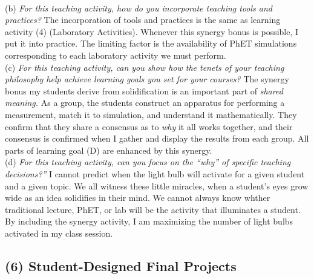 \documentclass[../../../main.tex]{subfiles}
\begin{document}
\\
\vspace{0.25cm}
(b) \textit{For this teaching activity, how do you incorporate teaching tools and practices?}  The incorporation of tools and practices is the same as learning activity (4) (Laboratory Activities).  Whenever this synergy bonus is possible, I put it into practice.  The limiting factor is the availability of PhET simulations corresponding to each laboratory activity we must perform.
\\
\vspace{0.25cm}
(c) \textit{For this teaching activity, can you show how the tenets of your teaching philosophy help achieve learning goals you
set for your courses?}  The synergy bonus my students derive from solidification is an important part of \textit{shared meaning.}  As a group, the students construct an apparatus for performing a measurement, match it to simulation, and understand it mathematically.  They confirm that they share a consensus as to \textit{why} it all works together, and their consensus is confirmed when I gather and display the results from each group.  All parts of learning goal (D) are enhanced by this synergy.
\\
\vspace{0.25cm}
(d) \textit{For this teaching activity, can you focus on the ``why'' of specific teaching decisions?''} I cannot predict when the light bulb will activate for a given student and a given topic.  We all witness these little miracles, when a student's eyes grow wide as an idea solidifies in their mind.  We cannot always know whther traditional lecture, PhET, or lab will be the activity that illuminates a student.  By including the synergy activity, I am maximizing the number of light bulbs activated in my class session.

\subsection{(6) Student-Designed Final Projects}
\end{document}
